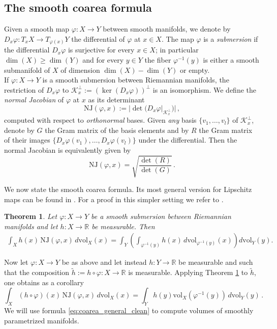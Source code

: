 \documentclass{article}
\newtheorem{theorem}{Theorem}
\theoremstyle{definition}
\newcommand{\R}{\mathbb{R}}
\newcommand{\vol}{\mathrm{vol}}
\newcommand{\NJ}{\mathrm{NJ}}
\begin{document}
\subsection{The smooth coarea formula}\label{sec:smooth_coarea}
Given a smooth map $\varphi:X \rightarrow Y$ between smooth manifolds, we denote by $D_x\varphi : T_xX \rightarrow T_{\varphi(x)}Y$ the differential of $\varphi$ at $x\in X$. The map $\varphi$ is a \emph{submersion} if the differential $D_x\varphi$ is surjective for every $x \in X$; in particular $\dim(X)\geq \dim(Y)$ and for every $y \in Y$ the fiber $\varphi^{-1}(y)$ is either a smooth submanifold of $X$ of dimension $\dim(X)-\dim(Y)$ or empty. \\
If $\varphi:X\rightarrow Y$ is a smooth submersion between Riemannian manifolds, the restriction of $D_x\varphi$ to $\mathcal K_x^{\perp} :=(\ker(D_x\varphi))^{\perp}$ is an isomorphism. We define the \emph{normal Jacobian} of $\varphi$ at $x$ as its determinant
\begin{equation*}
    \NJ(\varphi,x) := | \det(D_x\varphi|_{\mathcal K_x^{\perp}})|\,,
\end{equation*}
computed with respect to \emph{orthonormal} bases. Given \emph{any} basis $\{v_1,\dots,v_l\}$ of $\mathcal K_x^{\perp}$, denote by $G$ the Gram matrix of the basis elements and by $R$ the Gram matrix of their images $\{D_x\varphi(v_1),\dots,D_x\varphi(v_l)\}$ under the differential. Then the normal Jacobian is equivalently given by
\begin{equation}\label{eq:NJ_any}
    \NJ(\varphi,x)=\sqrt{\frac{\det(R)}{\det(G)}} \, .
\end{equation}

We now state the smooth coarea formula. Its most general version for Lipschitz maps can be found in \cite{Federer_1969}. For a proof in this simpler setting we refer to \cite[Section A-2]{howard_1993}.

\begin{theorem}\label{thm:smooth_coarea}
    Let $\varphi:X\rightarrow Y$ be a smooth submersion between Riemannian manifolds and let $h:X\rightarrow \R$ be measurable. Then  
    \begin{align*}
        \int_X h(x)\,\NJ(\varphi,x)\, d\vol_X(x) = \int_Y\left(\int_{\varphi^{-1}(y)} h(x)\, d\vol_{\varphi^{-1}(y)}(x)\right)d\vol_Y(y).
    \end{align*}
\end{theorem}

Now let $\varphi:X\rightarrow Y$ be as above and let instead $h:Y \rightarrow\R$ be measurable and such that the composition $\tilde h:=h\circ\varphi:X \rightarrow \R$ is measurable. Applying Theorem \ref{thm:smooth_coarea} to $\tilde h$, one obtains as a corollary
\begin{equation}\label{eq:coarea_general_clean}
    \int_X (h\circ\varphi)(x)\,\NJ(\varphi,x)\,d\vol_X(x) = \int_Y h(y) \vol_X(\varphi^{-1}(y))\,d\vol_Y(y)\, .
\end{equation}
We will use formula \eqref{eq:coarea_general_clean} to compute volumes of smoothly parametrized manifolds. 
\end{document}
